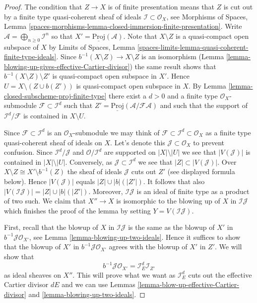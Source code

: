 \begin{proof}
The condition that $Z \to X$ is of finite presentation means that
$Z$ is cut out by a finite type quasi-coherent sheaf of ideals
$\mathcal{I} \subset \mathcal{O}_X$, see
Morphisms of Spaces, Lemma
\ref{spaces-morphisms-lemma-closed-immersion-finite-presentation}.
Write $\mathcal{A} = \bigoplus_{n \geq 0} \mathcal{I}^n$ so that
$X' = \underline{\text{Proj}}(\mathcal{A})$.
Note that $X \setminus Z$ is a quasi-compact open subspace of $X$ by
Limits of Spaces, Lemma
\ref{spaces-limits-lemma-quasi-coherent-finite-type-ideals}.
Since $b^{-1}(X \setminus Z) \to X \setminus Z$ is an isomorphism
(Lemma \ref{lemma-blowing-up-gives-effective-Cartier-divisor}) the same
result shows that
$b^{-1}(X \setminus Z) \setminus Z'$ is quasi-compact open subspace in $X'$.
Hence $U = X \setminus (Z \cup b(Z'))$ is quasi-compact open subspace in $X$.
By Lemma \ref{lemma-closed-subscheme-proj-finite-type}
there exist a $d > 0$ and a finite type
$\mathcal{O}_X$-submodule $\mathcal{F} \subset \mathcal{I}^d$ such
that $Z' = \underline{\text{Proj}}(\mathcal{A}/\mathcal{F}\mathcal{A})$
and such that the support of $\mathcal{I}^d/\mathcal{F}$ is contained
in $X \setminus U$.

\medskip\noindent
Since $\mathcal{F} \subset \mathcal{I}^d$ is an $\mathcal{O}_X$-submodule
we may think of $\mathcal{F} \subset \mathcal{I}^d \subset \mathcal{O}_X$
as a finite type quasi-coherent sheaf of ideals on $X$. Let's denote this
$\mathcal{J} \subset \mathcal{O}_X$ to prevent confusion. Since
$\mathcal{I}^d / \mathcal{J}$ and $\mathcal{O}/\mathcal{I}^d$ are
supported on $|X| \setminus |U|$ we see that $|V(\mathcal{J})|$ is contained
in $|X| \setminus |U|$. Conversely, as $\mathcal{J} \subset \mathcal{I}^d$
we see that $|Z| \subset |V(\mathcal{J})|$. Over
$X \setminus Z \cong X' \setminus b^{-1}(Z)$ the sheaf of ideals
$\mathcal{J}$ cuts out $Z'$ (see displayed formula below). Hence
$|V(\mathcal{J})|$ equals $|Z| \cup |b|(|Z'|)$. It follows that also
$|V(\mathcal{I}\mathcal{J})| = |Z| \cup |b|(|Z'|)$. Moreover,
$\mathcal{I}\mathcal{J}$ is an ideal of finite type as a product of two such.
We claim that $X'' \to X$ is isomorphic to the blowing up of $X$ in
$\mathcal{I}\mathcal{J}$ which finishes the proof of the lemma by setting
$Y = V(\mathcal{I}\mathcal{J})$.

\medskip\noindent
First, recall that the blowup of $X$ in $\mathcal{I}\mathcal{J}$
is the same as the blowup of $X'$ in $b^{-1}\mathcal{J} \mathcal{O}_{X'}$,
see Lemma \ref{lemma-blowing-up-two-ideals}.
Hence it suffices to show that the blowup of $X'$ in
$b^{-1}\mathcal{J} \mathcal{O}_{X'}$ agrees with the blowup of $X'$
in $Z'$. We will show that
$$
b^{-1}\mathcal{J} \mathcal{O}_{X'} = \mathcal{I}_E^d \mathcal{I}_{Z'}
$$
as ideal sheaves on $X''$. This will prove what we want as
$\mathcal{I}_E^d$ cuts out the effective Cartier divisor $dE$
and we can use Lemmas \ref{lemma-blow-up-effective-Cartier-divisor} and
\ref{lemma-blowing-up-two-ideals}.


\end{proof}
